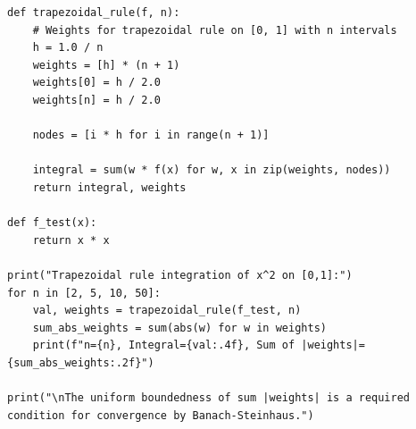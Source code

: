\documentclass[11pt,a4paper]{article}
\begin{document}
\begin{lstlisting}
def trapezoidal_rule(f, n):
    # Weights for trapezoidal rule on [0, 1] with n intervals
    h = 1.0 / n
    weights = [h] * (n + 1)
    weights[0] = h / 2.0
    weights[n] = h / 2.0

    nodes = [i * h for i in range(n + 1)]

    integral = sum(w * f(x) for w, x in zip(weights, nodes))
    return integral, weights

def f_test(x):
    return x * x

print("Trapezoidal rule integration of x^2 on [0,1]:")
for n in [2, 5, 10, 50]:
    val, weights = trapezoidal_rule(f_test, n)
    sum_abs_weights = sum(abs(w) for w in weights)
    print(f"n={n}, Integral={val:.4f}, Sum of |weights|={sum_abs_weights:.2f}")

print("\nThe uniform boundedness of sum |weights| is a required condition for convergence by Banach-Steinhaus.")
\end{lstlisting}
\vspace{1cm}
\end{document}
